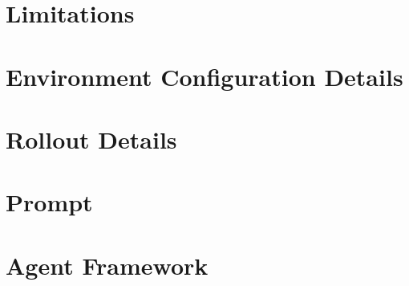 \documentclass[11pt]{article}
\begin{document}
\section{Limitations}
\label{sec:limitation}











%


\appendix
\section{Environment Configuration Details}
\label{appendix:env_details}



\section{Rollout Details}
\label{appendix:rollout_obs}


\section{Prompt}
\label{appendix:prompt}


\section{Agent Framework}
\label{appendix:agent_framework}

\end{document}
